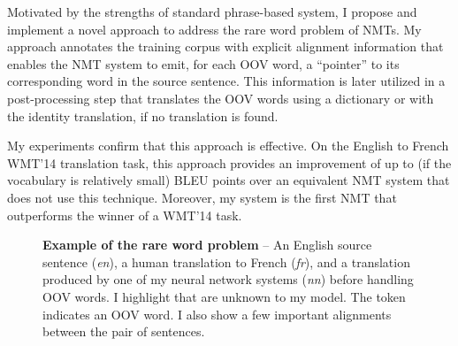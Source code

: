 Motivated by the strengths of standard phrase-based system, I 
propose and implement a novel approach to address the rare word problem of NMTs.
My approach annotates the training corpus with 
explicit alignment information that enables the NMT system to emit, for each OOV word, a
``pointer'' to its corresponding word in the source sentence. This
information is later utilized in a post-processing step that translates
the OOV words using a dictionary or with the identity translation, if no translation is found.

My experiments confirm that this approach is effective. On the English to French WMT'14
translation task, this approach provides an improvement of
up to \bestunkimp{} (if the vocabulary is relatively small) 
BLEU points over an equivalent NMT system that does not use this technique.
Moreover, my system is the first NMT that outperforms the winner of a WMT'14 task.

\begin{figure*}[tbh!]
\caption[Example of the rare word problem]{{\bf Example of the rare word problem} -- An English source sentence ({\it en}), a human translation to French ({\it fr}), and a translation produced by one of my neural network systems ({\it nn}) before handling OOV words. I highlight  that are unknown to my model. 
The token \unksym{} indicates an OOV word. 
I also show a few important alignments between the pair of sentences. 
}
\label{f:sent_pair}
\end{figure*}


